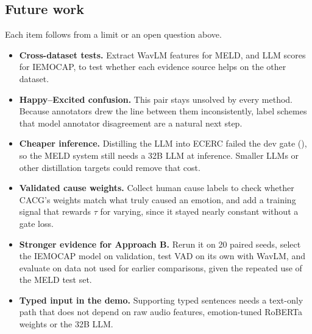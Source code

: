 \documentclass[11pt,a4paper]{article}
\newcommand{\mn}{\textminus}
\begin{document}
\subsection{Future work}

Each item follows from a limit or an open question above.

\begin{itemize}
  \item \textbf{Cross-dataset tests.} Extract WavLM features for MELD, and LLM scores for IEMOCAP, to test whether each evidence source helps on the other dataset.
  \item \textbf{Happy--Excited confusion.} This pair stays unsolved by every method. Because annotators drew the line between them inconsistently, label schemes that model annotator disagreement are a natural next step.
  \item \textbf{Cheaper inference.} Distilling the LLM into ECERC failed the dev gate (\mn0.42), so the MELD system still needs a 32B LLM at inference. Smaller LLMs or other distillation targets could remove that cost.
  \item \textbf{Validated cause weights.} Collect human cause labels to check whether CACG's weights match what truly caused an emotion, and add a training signal that rewards $\tau$ for varying, since it stayed nearly constant without a gate loss.
  \item \textbf{Stronger evidence for Approach B.} Rerun it on 20 paired seeds, select the IEMOCAP model on validation, test VAD on its own with WavLM, and evaluate on data not used for earlier comparisons, given the repeated use of the MELD test set.
  \item \textbf{Typed input in the demo.} Supporting typed sentences needs a text-only path that does not depend on raw audio features, emotion-tuned RoBERTa weights or the 32B LLM.
\end{itemize}
\end{document}
